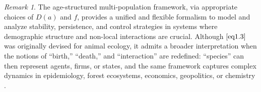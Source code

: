 \documentclass[10pt, a4paper]{amsart}
\theoremstyle{plain}
\theoremstyle{definition}
\theoremstyle{remark}
\newtheorem{remark}[lemma]{Remark}
\numberwithin{equation}{section}
\begin{document}
\begin{remark}
The age-structured multi-population framework, via appropriate choices of $D(a)$ and $f$, provides a unified and flexible formalism to model and analyze stability, persistence, and control strategies in systems where demographic structure and non-local interactions are crucial. Although $\eqref{eq1.3}$ was originally devised for animal ecology, it admits a broader interpretation when the notions of “birth,” “death,” and “interaction” are redefined: “species” can then represent agents, firms, or states, and the same framework captures complex dynamics in epidemiology, forest ecosystems, economics, geopolitics, or chemistry \cite{ref74,ref65,ref66, ref67,ref53}.

\end{remark}
\end{document}
